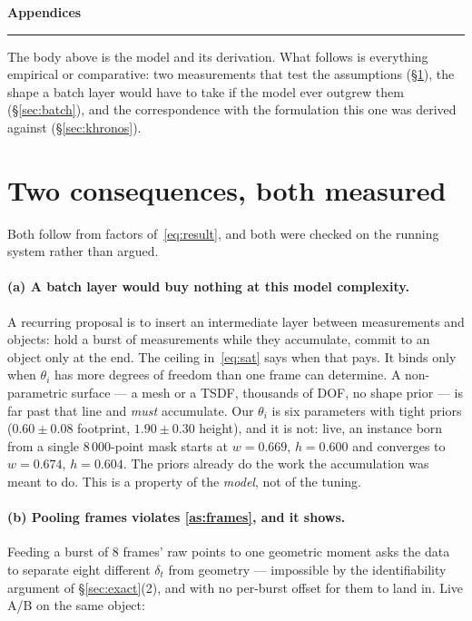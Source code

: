 \documentclass[11pt,a4paper]{report}
\theoremstyle{definition}   %
\begin{document}
\clearpage
\appendix
\renewcommand{\thesection}{\Alph{section}}
\setcounter{section}{0}

\begin{center}
{\Large\bfseries Appendices}\\[4pt]
\rule{0.32\textwidth}{0.4pt}
\end{center}

\medskip\noindent
The body above is the model and its derivation. What follows is everything empirical or
comparative: two measurements that test the assumptions (\S\ref{sec:consequences}), the shape a
batch layer would have to take if the model ever outgrew them (\S\ref{sec:batch}), and the
correspondence with the formulation this one was derived against (\S\ref{sec:khronos}).

\section{Two consequences, both measured}
\label{sec:consequences}

Both follow from factors of~\eqref{eq:result}, and both were checked on the running system rather
than argued.

\paragraph{(a) A batch layer would buy nothing at this model complexity.}
A recurring proposal is to insert an intermediate layer between measurements and objects: hold a
burst of measurements while they accumulate, commit to an object only at the end. The ceiling
in~\eqref{eq:sat} says when that pays. It binds only when $\theta_i$ has more degrees of freedom
than one frame can determine. A non-parametric surface --- a mesh or a TSDF, thousands of DOF, no
shape prior --- is far past that line and \emph{must} accumulate. Our $\theta_i$ is six
parameters with tight priors ($0.60\pm0.08$ footprint, $1.90\pm0.30$ height), and it is not:
live, an instance born from a single $8\,000$-point mask starts at $w=0.669$, $h=0.600$ and
converges to $w=0.674$, $h=0.604$. The priors already do the work the accumulation was meant to
do. This is a property of the \emph{model}, not of the tuning.

\paragraph{(b) Pooling frames violates \ref{as:frames}, and it shows.}
Feeding a burst of $8$ frames' raw points to one geometric moment asks the data to separate eight
different $\delta_t$ from geometry --- impossible by the identifiability argument of \S\ref{sec:exact}(2), and with no per-burst
offset for them to land in. Live A/B on the same object:
\end{document}

